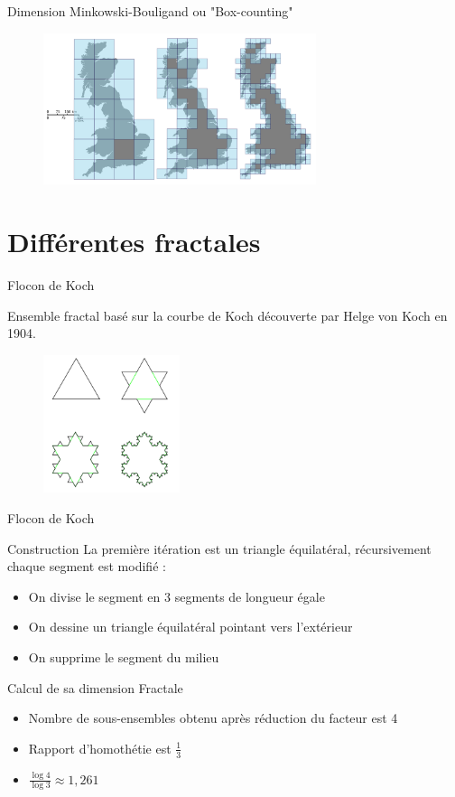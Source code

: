 \documentclass{beamer}
\begin{document}
\begin{frame}{Dimension Minkowski-Bouligand ou "Box-counting"}
\begin{figure}[H]
  \centering
  \includegraphics[width=80mm]{Great_Britain_Box.png}
 \end{figure}
\end{frame}


\section{Différentes fractales}

\begin{frame}{Flocon de Koch}
\begin{block}{}
Ensemble fractal basé sur la courbe de Koch découverte par Helge von Koch en 1904.
\end{block}
\begin{figure}[H]
  \centering
  \includegraphics[width=40mm]{floncon.PNG}
 \end{figure}
\end{frame}

\begin{frame}{Flocon de Koch}
\begin{block}{Construction}
La première itération est un triangle équilatéral, récursivement chaque segment est modifié :
    \begin{itemize}
        \item On divise le segment en 3 segments de longueur égale
        \item On dessine un triangle équilatéral pointant vers l'extérieur
        \item On supprime le segment du milieu
    \end{itemize}
\end{block}
\begin{block}{Calcul de sa dimension Fractale}
    \begin{itemize}
        \item Nombre de sous-ensembles obtenu après réduction du facteur est 4
        \item Rapport d'homothétie est $\frac{1}{3}$
        \item $\frac{\log 4}{\log 3} \approx 1,261$
    \end{itemize}
\end{block}
\end{frame}
\end{document}
